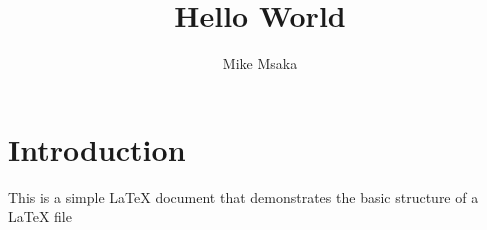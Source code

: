 \documentclass[11pt]{article}
\title{Hello World}
\author{Mike Msaka}
\begin{document}
\maketitle

\section{Introduction}
This is a simple LaTeX document that demonstrates the basic structure of a LaTeX file
\end{document}
